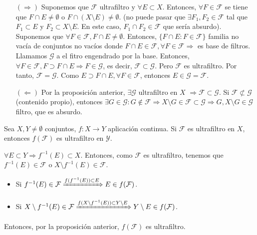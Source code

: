 \begin{dem}
  \begin{enumerate}[label=(\roman*)]
    \item []
    \item [$(\Rightarrow)$] Suponemos que $\mathcal{F}$ ultrafiltro y $\forall E \subset X$. Entonces, $\forall F \in \mathcal{F}$ se tiene que $F \cap E \neq \emptyset$ o $F \cap (X \setminus E) \neq \emptyset$. (no puede pasar que $\exists F_{1}, F_{2} \in \mathcal{F}$ tal que $F_{1} \subset E$ y $F_{2} \subset X \setminus E$. En este caso, $F_{1} \cap F_{2} \in \mathcal{F}$ que sería absurdo). Suponemos que $\forall F \in \mathcal{F}, F \cap E \neq \emptyset$. Entonces, $\{ F \cap E : F \in \mathcal{F} \}$ familia no vacía de conjuntos no vacíos donde $F \cap E \in \mathcal{F}, \forall F \in \mathcal{F} \Rightarrow $ es base de filtros. Llamamos $\mathcal{G}$ a el fitro engendrado por la base. Entonces, $\forall F \in \mathcal{F}, F \supset F \cap E \Rightarrow F \in \mathcal{G}$, es decir, $\mathcal{F} \subset \mathcal{G}$. Pero $\mathcal{F}$ es ultrafiltro. Por tanto, $\mathcal{F} = \mathcal{G}$. Como $E \supset F \cap E, \forall F \in \mathcal{F}$, entonces $E \in \mathcal{G} = \mathcal{F}$.
    \item [$(\Leftarrow)$] Por la proposición anterior, $\exists \mathcal{G}$ ultrafiltro en $X$ $\Rightarrow \mathcal{F} \subset \mathcal{G}$. Si $\mathcal{F} \not \subset \mathcal{G}$(contenido propio), entonces $\exists G \in \mathcal{G}: G \not \in \mathcal{F} \Rightarrow X \setminus G \in \mathcal{F} \subset \mathcal{G} \Rightarrow G, X \setminus G \in \mathcal{G}$ filtro, que es absurdo.
  \end{enumerate}
\end{dem}

\begin{prop}
  Sea $X, Y \neq \emptyset$ conjuntos, $f : X \to Y$ aplicación continua. Si $\mathcal{F}$ es ultrafiltro en $X$, entonces $f(\mathcal{F})$ es ultrafiltro en $\mathcal{Y}$.
\end{prop}

\begin{dem}
  $\forall E \subset Y \Rightarrow f^{-1}(E) \subset X$. Entonces, como $\mathcal{F}$ es ultrafiltro, tenemos que $f^{-1}(E) \in \mathcal{F}$ o $X \setminus f^{-1}(E) \in \mathcal{F}$.
  \begin{itemize}
    \item Si $f^{-1}(E) \in \mathcal{F} \xRightarrow[]{ f(f^{-1}(E)) \subset E } E \in f(\mathcal{F})$.
    \item Si $X \setminus f^{-1}(E) \in \mathcal{F} \xRightarrow[]{ f(X \setminus f^{-1}(E)) \subset Y \setminus E } Y \setminus E \in f(\mathcal{F})$.
  \end{itemize}
  Entonces, por la proposición anterior, $f(\mathcal{F})$ es ultrafiltro.
\end{dem}

